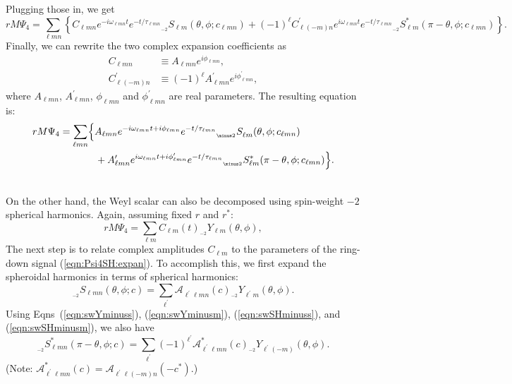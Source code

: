 \documentclass[11pt]{article}
\newcommand{\swY}[4][]{{}_{{}_{#2}}\!Y^{#1}_{#3}(#4)}
\newcommand{\swSH}[5][]{{}_{{}_{#2}}S^{#1}_{#3}(#4;#5)}
\newcommand{\YSH}[3][]{\mathcal{A}^{#1}_{#2}(#3)}
\begin{document}
\noindent
Plugging those in, we get
\begin{equation}
\nonumber rM\Psi_4 = \sum_{\ell{m}n} \left\{C_{\ell{m}n} e^{-i\omega_{\ell{m}n}t}e^{-t/\tau_{\ell{m}n}} \swSH{\minus 2}{\ell{m}}{\theta,\phi}{c_{\ell{m}n}}
  + (-1)^\ell C^\prime_{\ell(-m)n} e^{i\omega_{\ell{m}n}t}e^{-t/\tau_{\ell{m}n}} \swSH[*]{\minus 2}{\ell{m}}{\pi-\theta,\phi}{c_{\ell{m}n}} \right\}.
\end{equation}
Finally, we can rewrite the two complex expansion coefficients as
\begin{align}
  C_{\ell{m}n} &\equiv A_{\ell{m}n}e^{i\phi_{\ell{m}n}}, \\
  C^\prime_{\ell(-m)n} &\equiv (-1)^\ell A^\prime_{\ell{m}n}e^{i\phi^\prime_{\ell{m}n}},
\end{align}
where $A_{\ell{m}n}$, $A^\prime_{\ell{m}n}$, $\phi_{\ell{m}n}$ and $\phi^\prime_{\ell{m}n}$ are real parameters.  The resulting equation is:
\begin{align} \label{eqn:Psi4SH:expan}
\nonumber rM\Psi_4 &= \sum_{\ell{m}n} \Bigl\{A_{\ell{m}n} e^{-i\omega_{\ell{m}n}t+i\phi_{\ell{m}n}}e^{-t/\tau_{\ell{m}n}} \swSH{\minus 2}{\ell{m}}{\theta,\phi}{c_{\ell{m}n}} \nonumber\\ & {} \hspace{0.5in}
  + A^\prime_{\ell{m}n} e^{i\omega_{\ell{m}n}t+i\phi^\prime_{\ell{m}n}}e^{-t/\tau_{\ell{m}n}} \swSH[*]{\minus 2}{\ell{m}}{\pi-\theta,\phi}{c_{\ell{m}n}} \Bigr\}.
\end{align}

\noindent\\
On the other hand, the Weyl scalar can also be decomposed using spin-weight $\minus 2$ spherical harmonics.  Again, assuming fixed $r$ and $r^*$:
\begin{equation}\label{eqn:Psi4Y:expan}
rM\Psi_4 = \sum_{\ell{m}} C_{\ell{m}}(t) \swY{\minus 2}{\ell{m}}{\theta,\phi},
\end{equation} 
The next step is to relate complex amplitudes $C_{\ell{m}}$ to the parameters of the ring-down signal (\ref{eqn:Psi4SH:expan}).  To accomplish this, we first expand the spheroidal harmonics in terms of spherical harmonics:
\begin{equation} \label{eqn:swSH:expan}
\swSH{\minus 2}{\ell{m}n}{\theta,\phi}{c} = \sum_{\ell^\prime} \YSH{\ell^\prime\ell{m}n}{c} \swY{\minus 2}{\ell^\prime{m}}{\theta,\phi}.
\end{equation}
Using Eqns~(\ref{eqn:swYminuss}), (\ref{eqn:swYminusm}), (\ref{eqn:swSHminuss}), and (\ref{eqn:swSHminusm}), we also have
\begin{equation} \label{eqn:swSconj:expan}
\swSH[*]{\minus 2}{\ell{m}n}{\pi-\theta,\phi}{c} = \sum_{\ell^\prime} (-1)^{\ell^\prime}\YSH[*]{\ell^\prime\ell{m}n}{c} \swY{\minus 2}{\ell^\prime(-m)}{\theta,\phi}.
\end{equation}
(Note: $\YSH[*]{\ell^\prime\ell{m}n}{c} = \YSH{\ell^\prime\ell(-m)n}{-c^*}$.)
\end{document}
